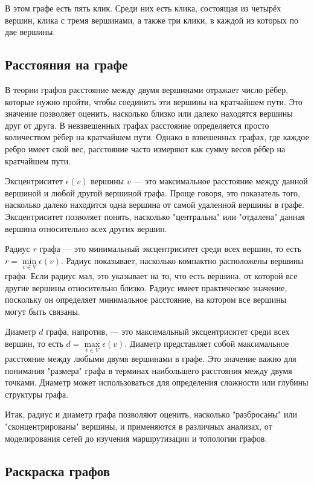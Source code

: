 В этом графе есть пять клик. Среди них есть клика, состоящая из четырёх вершин, клика с тремя вершинами, а также три клики, в каждой из которых по две вершины.


\subsection{Расстояния на графе}

В теории графов расстояние между двумя вершинами отражает число рёбер, которые нужно пройти, чтобы соединить эти вершины на кратчайшем пути. Это значение позволяет оценить, насколько близко или далеко находятся вершины друг от друга. В невзвешенных графах расстояние определяется просто количеством рёбер на кратчайшем пути. Однако в взвешенных графах, где каждое ребро имеет свой вес, расстояние часто измеряют как сумму весов рёбер на кратчайшем пути.

Эксцентриситет $\epsilon(v)$ вершины $v$ — это максимальное расстояние между данной вершиной и любой другой вершиной графа. Проще говоря, это показатель того, насколько далеко находится одна вершина от самой удаленной вершины в графе. Эксцентриситет позволяет понять, насколько "центральна" или "отдалена" данная вершина относительно всех других вершин.

Радиус $r$ графа — это минимальный эксцентриситет среди всех вершин, то есть $r = \min\limits_{v \in V} \epsilon(v)$. Радиус показывает, насколько компактно расположены вершины графа. Если радиус мал, это указывает на то, что есть вершина, от которой все другие вершины относительно близко. Радиус имеет практическое значение, поскольку он определяет минимальное расстояние, на котором все вершины могут быть связаны.

Диаметр $d$ графа, напротив, — это максимальный эксцентриситет среди всех вершин, то есть $d = \max\limits_{v \in V} \epsilon(v)$. Диаметр представляет собой максимальное расстояние между любыми двумя вершинами в графе. Это значение важно для понимания "размера" графа в терминах наибольшего расстояния между двумя точками. Диаметр может использоваться для определения сложности или глубины структуры графа.

Итак, радиус и диаметр графа позволяют оценить, насколько "разбросаны" или "сконцентрированы" вершины, и применяются в различных анализах, от моделирования сетей до изучения маршрутизации и топологии графов.


\subsection{Раскраска графов}

